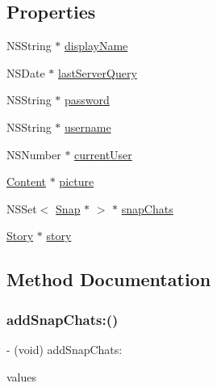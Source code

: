\subsection*{Properties}
\begin{DoxyCompactItemize}
\item 
N\+S\+String $\ast$ \hyperlink{interface_user_info_ae3f7388231cb3ebbeb37678e809b39c8}{display\+Name}
\item 
N\+S\+Date $\ast$ \hyperlink{interface_user_info_aab2017ab16d2bef45391eaeec44b71d0}{last\+Server\+Query}
\item 
N\+S\+String $\ast$ \hyperlink{interface_user_info_a128961270ae5c23c5acbc461bb502083}{password}
\item 
N\+S\+String $\ast$ \hyperlink{interface_user_info_a678541351323dc073a5696e15f0b3f3c}{username}
\item 
N\+S\+Number $\ast$ \hyperlink{interface_user_info_a725f8b96488308d73380d050eed90b95}{current\+User}
\item 
\hyperlink{interface_content}{Content} $\ast$ \hyperlink{interface_user_info_abb220fe03fd04d798d5fff55a174a89c}{picture}
\item 
N\+S\+Set$<$ \hyperlink{interface_snap}{Snap} $\ast$ $>$ $\ast$ \hyperlink{interface_user_info_afdfa30db3ce1f305298e33e693e626e8}{snap\+Chats}
\item 
\hyperlink{interface_story}{Story} $\ast$ \hyperlink{interface_user_info_afeb3aca2ca38cb9b64ca84ee98e90260}{story}
\end{DoxyCompactItemize}


\subsection{Method Documentation}
\hypertarget{interface_user_info_a7f9a4fea0aa960f777e6f5763f6de9f0}{}\label{interface_user_info_a7f9a4fea0aa960f777e6f5763f6de9f0} 
\subsubsection{\texorpdfstring{add\+Snap\+Chats\+:()}{addSnapChats:()}}
{\footnotesize\ttfamily -\/ (void) add\+Snap\+Chats\+: \begin{DoxyParamCaption}\item[{(N\+S\+Set$<$ \hyperlink{interface_snap}{Snap} $\ast$ $>$ $\ast$)}]{values }\end{DoxyParamCaption}}



